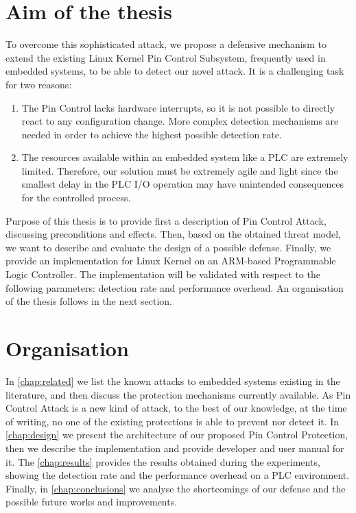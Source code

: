 \section{Aim of the thesis}

To overcome this sophisticated attack, we propose a defensive mechanism to extend the existing Linux Kernel Pin Control Subsystem, frequently used in embedded systems,
to be able to detect our novel attack. It is a challenging task for two reasons:
\begin{enumerate}
	\item The Pin Control lacks hardware interrupts, so it is not possible to directly react to any configuration change. More complex detection mechanisms are needed
		in order to achieve the highest possible detection rate.
	\item The resources available within an embedded system like a PLC are extremely limited. Therefore, our solution must be extremely agile and light
		since the smallest delay in the PLC I/O operation may have unintended consequences for the controlled process.
\end{enumerate}

Purpose of this thesis is to provide first a description of Pin Control Attack, discussing preconditions and effects.
Then, based on the obtained threat model, we want to describe and evaluate the design of a possible defense.
Finally, we provide an implementation for Linux Kernel on an ARM-based Programmable Logic Controller.
The implementation will be validated with respect to the following parameters: detection rate and performance overhead.
An organisation of the thesis follows in the next section.


\section{Organisation}

In \chap \ref{chap:related} we list the known attacks to embedded systems existing in the literature, and then discuss the protection mechanisms currently available.
As Pin Control Attack is a new kind of attack, to the best of our knowledge, at the time of writing, no one of the existing protections is able to prevent nor detect it.
In \chap \ref{chap:design} we present the architecture of our proposed Pin Control Protection, then we describe the implementation and provide developer and user manual for it.
The \chap \ref{chap:results} provides the results obtained during the experiments, showing the detection rate and the performance overhead on a PLC environment.
Finally, in \chap \ref{chap:conclusions} we analyse the shortcomings of our defense and the possible future works and improvements.
